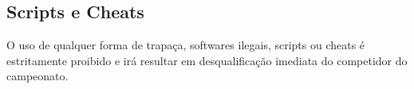 \subsection{Scripts e Cheats}

O uso de qualquer forma de trapaça, softwares ilegais, scripts ou cheats é estritamente proibido e irá resultar em desqualificação imediata do competidor do campeonato.